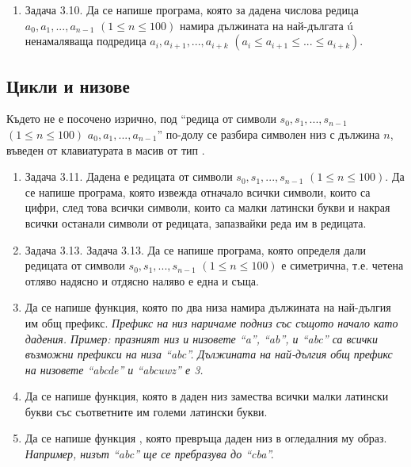 {\begin{enumerate}[]
		\item Задача 3.10. \cite{sbornik} Да се напише програма, която за дадена числова редица $a_0, a_1, ..., a_{n-1}$ $(1 \leq n \leq 100)$ намира дължината на най-дългата ú ненамаляваща подредица $a_i, a_{i+1}, ..., a_{i+k}$ $(a_i \leq a_{i+1} \leq ... \leq a_{i+k})$.


\end{enumerate}

\subsection {Цикли и низове}
Където не е посочено изрично, под ``редица от символи $s_0, s_1, ..., s_{n-1}$ $(1 \leq n \leq 100)$ $a_0, a_1, ..., a_{n-1}$'' по-долу се разбира символен низ с дължина $n$, въведен от клавиатурата в масив от тип .

\begin{enumerate}[resume]


  \item Задача 3.11. \cite{sbornik}	Дадена е редицата от символи $s_0, s_1, ..., s_{n-1}$ $(1 \leq n \leq 100)$. Да се напише програма, която извежда отначало всички символи, които са цифри, след това всички символи, които са малки латински букви и накрая всички останали символи от редицата, запазвайки реда им в редицата.

	\item Задача 3.13. \cite{sbornik} Задача 3.13. Да се напише програма, която определя дали редицата от символи $s_0, s_1, ..., s_{n-1}$ $(1 \leq n \leq 100)$ е симетрична, т.е. четена отляво надясно и отдясно наляво е една и съща.

  \item Да се напише функция, която по два низа намира дължината на най-дългия им общ префикс. \textit{Префикс на низ наричаме подниз със същото начало като дадения. Пример: празният низ и низовете ``a'', ``ab'', и ``abc'' са всички възможни префикси на низа ``abc''. Дължината на най-дългия общ префикс на низовете ``abcde'' и ``abcuwz'' е 3.}

  \item Да се напише функция, която в даден низ замества всички малки латински букви със съответните им големи латински букви.

  \item Да се напише функция , която превръща даден низ в огледалния му образ. \textit{Например, низът ``abc'' ще се пребразува до ``cba''.}


\end{enumerate}}
